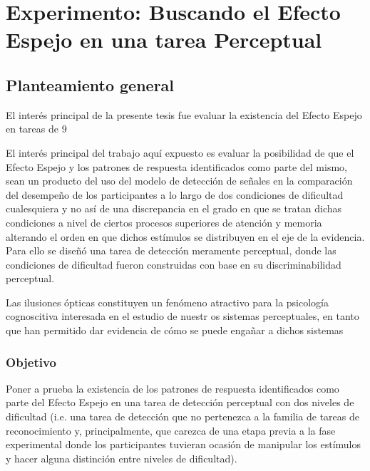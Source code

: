 
\chapter{Experimento: Buscando el Efecto Espejo en una tarea Perceptual} %

\label{Cap_Exp} %

\section{Planteamiento general}

El interés principal de la presente tesis fue evaluar la existencia del Efecto Espejo en tareas de 9

El interés principal del trabajo aquí expuesto es evaluar la posibilidad de que el Efecto Espejo y los patrones de respuesta identificados como parte del mismo, sean un producto del uso del modelo de detección de señales en la comparación del desempeño de los participantes a lo largo de dos condiciones de dificultad cualesquiera y no así de una discrepancia en el grado en que se tratan dichas condiciones a nivel de ciertos procesos superiores de atención y memoria alterando el orden en que dichos estímulos se distribuyen en el eje de la evidencia. Para ello se diseñó una tarea de detección meramente perceptual, donde las condiciones de dificultad fueron construidas con base en su discriminabilidad perceptual. 

Las ilusiones ópticas constituyen un fenómeno atractivo para la psicología cognoscitiva interesada en el estudio de nuestr os sistemas perceptuales, en tanto que han permitido dar evidencia de cómo se puede engañar a dichos sistemas 


\subsection{Objetivo}

Poner a prueba la existencia de los patrones de respuesta identificados como parte del Efecto Espejo en una tarea de detección perceptual con dos niveles de dificultad (i.e. una tarea de detección que no pertenezca a la familia de tareas de reconocimiento y, principalmente, que carezca de una etapa previa a la fase experimental donde los participantes tuvieran ocasión de manipular los estímulos y hacer alguna distinción entre niveles de dificultad).


